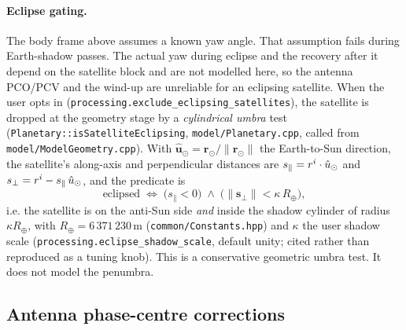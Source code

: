 \documentclass[main.tex]{subfiles}
\begin{document}
\paragraph{Eclipse gating.}
The body frame above assumes a known yaw angle.  That assumption fails
during Earth-shadow passes.  The actual yaw during eclipse and the
recovery after it depend on the satellite block and are not modelled
here, so the antenna PCO/PCV and the wind-up are unreliable for an
eclipsing satellite.  When the user opts in
(\texttt{processing.exclude\_eclipsing\_satellites}), the satellite is
dropped at the geometry stage by a \emph{cylindrical umbra} test
(\texttt{Planetary::isSatelliteEclipsing}, \texttt{model/Planetary.cpp},
called from \texttt{model/ModelGeometry.cpp}).  With
$\hat{\bm{u}}_\odot=\bm{r}_\odot/\lVert\bm{r}_\odot\rVert$ the Earth-to-Sun
direction, the satellite's along-axis and perpendicular distances are
$s_\parallel=r^{i}\cdot\hat{u}_\odot$ and $s_\perp=r^{i} -
s_\parallel\,\hat{u}_\odot$, and the predicate is
\begin{equation}
\text{eclipsed}
\;\Longleftrightarrow\;
\big(s_\parallel < 0\big)
\;\wedge\;
\big(\lVert\bm{s}_\perp\rVert < \kappa\,R_\oplus\big),
\label{eq:obsphys-eclipse}
\end{equation}
i.e. the satellite is on the anti-Sun side \emph{and} inside the shadow
cylinder of radius $\kappa R_\oplus$, with $R_\oplus = 6\,371\,230$\,m
(\texttt{common/Constants.hpp}) and $\kappa$ the user shadow scale
(\texttt{processing.eclipse\_shadow\_scale}, default unity; cited rather
than reproduced as a tuning knob).  This is a conservative geometric
umbra test.  It does not model the penumbra.

\subsection{Antenna phase-centre corrections}\label{sec:obsphys-antenna}
\end{document}
